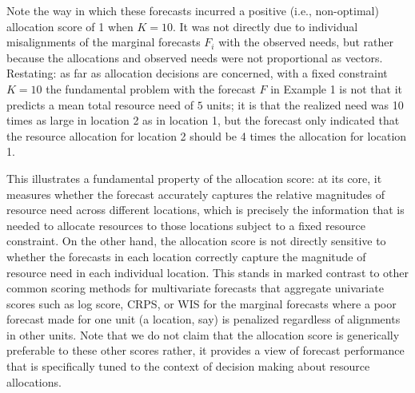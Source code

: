 \documentclass{article}\usepackage[]{graphicx}\usepackage[]{xcolor}
\begin{document}
Note the way in which these forecasts incurred a positive (i.e., non-optimal) allocation score of 1 when $K = 10$. It was not directly due to individual misalignments of the marginal forecasts $F_i$ with the observed needs, but rather because the allocations and observed needs were not proportional as vectors.
Restating: as far as allocation decisions are concerned, with a fixed constraint $K=10$ the fundamental problem with the forecast $F$ in Example 1 is not that it predicts a mean total resource need of $5$ units; it is that the realized need was 10 times as large in location 2 as in location 1, but the forecast only indicated that the resource allocation for location 2 should be 4 times the allocation for location 1.

This illustrates a fundamental property of the allocation score: at its core, it measures whether the forecast accurately captures the relative magnitudes of resource need across different locations, which is precisely the information that is needed to allocate resources to those locations subject to a fixed resource constraint.
On the other hand, the allocation score is not directly sensitive to whether the forecasts in each location correctly capture the magnitude of resource need in each individual location.
This stands in marked contrast to other common scoring methods for multivariate forecasts that aggregate univariate scores such as log score, CRPS, or WIS for the marginal forecasts where a
poor forecast made for one unit (a location, say) is penalized regardless of alignments in other units. Note that we do not claim that the allocation score is generically preferable to these other scores \textemdash rather, it provides a view of forecast performance that is specifically tuned to the context of decision making about resource allocations.


\end{document}
